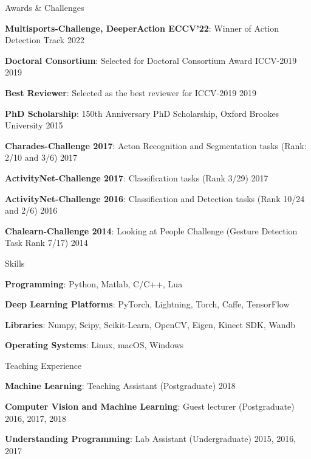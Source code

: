 \documentclass{resume_long} %
\begin{document}
\vspace{0.1in}
\begin{rSection}{Awards \& Challenges}{} \itemsep -2pt
\item \textbf{Multisports-Challenge, DeeperAction ECCV'22}: Winner of Action Detection Track \hfill 2022
\item \textbf{Doctoral Consortium}: Selected for Doctoral Consortium Award ICCV-2019 \hfill 2019
\item \textbf{Best Reviewer}: Selected as the best reviewer for ICCV-2019 \hfill 2019
\item \textbf{PhD Scholarship}: 150th Anniversary PhD Scholarship, Oxford Brookes University \hfill 2015
\item \textbf{Charades-Challenge 2017}: Acton Recognition and Segmentation tasks (Rank: 2/10 and 3/6) \hfill 2017
\item \textbf{ActivityNet-Challenge 2017}: Classification tasks (Rank 3/29)  \hfill 2017
\item \textbf{ActivityNet-Challenge 2016}: Classification and Detection tasks (Rank 10/24 and 2/6) \hfill 2016
\item \textbf{Chalearn-Challenge 2014}: Looking at People Challenge (Gesture Detection Task Rank 7/17) \hfill 2014
\end{rSection}


\vspace{0.1in}
\begin{rSection}{Skills}{} \itemsep -2pt
\item  \textbf{Programming}: Python, Matlab, C/C++, Lua
\item  \textbf{Deep Learning Platforms}: PyTorch, Lightning, Torch, Caffe, TensorFlow
\item  \textbf{Libraries}: Numpy, Scipy, Scikit-Learn, OpenCV, Eigen, Kinect SDK, Wandb
\item  \textbf{Operating Systems}: Linux, macOS, Windows
\end{rSection}

\vspace{0.1in}
\begin{rSection}{Teaching Experience}{} \itemsep -2pt
  \item  \textbf{Machine Learning}: Teaching Assistant (Postgraduate) \hfill 2018
  \item  \textbf{Computer Vision and Machine Learning}: Guest lecturer (Postgraduate) \hfill 2016, 2017, 2018
  \item  \textbf{Understanding Programming}: Lab Assistant (Undergraduate)  \hfill 2015, 2016, 2017
\end{rSection}
\end{document}
